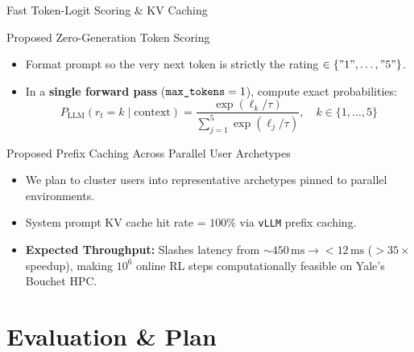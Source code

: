\documentclass[handout]{beamer}
\begin{document}
\begin{frame}{Fast Token-Logit Scoring \& KV Caching}
  \begin{alertblock}{Proposed Zero-Generation Token Scoring}
    \small
    \begin{itemize}
      \item Format prompt so the very next token is strictly the rating $\in \{"1",\dots,"5"\}$.
      \item In a \textbf{single forward pass} ($\text{\texttt{max\_tokens}}=1$), compute exact probabilities:
        \vspace{-0.25cm}
        \[
          P_{\text{LLM}}(r_t = k \mid \text{context}) = \frac{\exp(\ell_k / \tau)}{\sum_{j=1}^5 \exp(\ell_j / \tau)}, \quad k \in \{1,\dots,5\}
        \]
        \vspace{-0.45cm}
    \end{itemize}
  \end{alertblock}

  \pause
  \vspace{0.05cm}

  \begin{block}{Proposed Prefix Caching Across Parallel User Archetypes}
    \small
    \begin{itemize}
      \item We plan to cluster users into representative archetypes pinned to parallel environments.
      \item System prompt KV cache hit rate = $100\%$ via \texttt{vLLM} prefix caching.
      \item \textbf{Expected Throughput:} Slashes latency from \textbf{$\sim 450\,\text{ms} \to <12\,\text{ms}$} ($>35\times$ speedup), making $10^6$ online RL steps computationally feasible on Yale's Bouchet HPC.
    \end{itemize}
  \end{block}
\end{frame}

\section{Evaluation \& Plan}
\end{document}

